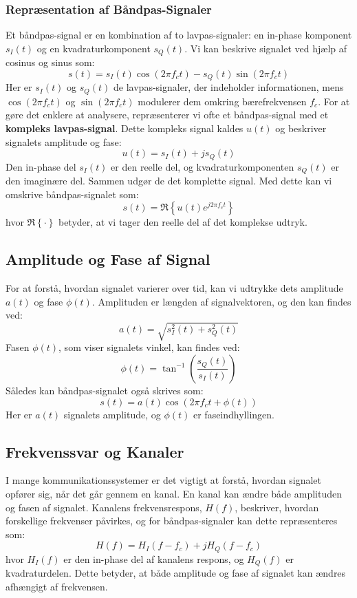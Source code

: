 \documentclass[a4paper,12pt]{book}
\begin{document}
	\subsubsection{Repræsentation af Båndpas-Signaler}
	Et båndpas-signal er en kombination af to lavpas-signaler: en in-phase komponent \( s_I(t) \) og en kvadraturkomponent \( s_Q(t) \). Vi kan beskrive signalet ved hjælp af cosinus og sinus som:
	\[
	s(t) = s_I(t) \cos(2\pi f_c t) - s_Q(t) \sin(2\pi f_c t)
	\]
	Her er \( s_I(t) \) og \( s_Q(t) \) de lavpas-signaler, der indeholder informationen, mens \( \cos(2\pi f_c t) \) og \( \sin(2\pi f_c t) \) modulerer dem omkring bærefrekvensen \( f_c \).
	\newline\newline\noindent
	For at gøre det enklere at analysere, repræsenterer vi ofte et båndpas-signal med et \textbf{kompleks lavpas-signal}. Dette kompleks signal kaldes \( u(t) \) og beskriver signalets amplitude og fase:
	\[
	u(t) = s_I(t) + j s_Q(t)
	\]
	Den in-phase del \( s_I(t) \) er den reelle del, og kvadraturkomponenten \( s_Q(t) \) er den imaginære del. Sammen udgør de det komplette signal. Med dette kan vi omskrive båndpas-signalet som:
	\[
	s(t) = \Re \left\{ u(t) e^{j 2 \pi f_c t} \right\}
	\]
	hvor \( \Re \left\{ \cdot \right\} \) betyder, at vi tager den reelle del af det komplekse udtryk.
	
	\subsection{Amplitude og Fase af Signal}
	For at forstå, hvordan signalet varierer over tid, kan vi udtrykke dets amplitude \( a(t) \) og fase \( \phi(t) \). Amplituden er længden af signalvektoren, og den kan findes ved:
	\[
	a(t) = \sqrt{s_I^2(t) + s_Q^2(t)}
	\]
	Fasen \( \phi(t) \), som viser signalets vinkel, kan findes ved:
	\[
	\phi(t) = \tan^{-1} \left( \frac{s_Q(t)}{s_I(t)} \right)
	\]
	Således kan båndpas-signalet også skrives som:
	\[
	s(t) = a(t) \cos(2 \pi f_c t + \phi(t))
	\]
	Her er \( a(t) \) signalets amplitude, og \( \phi(t) \) er faseindhyllingen.
	
	\subsection{Frekvenssvar og Kanaler}
	I mange kommunikationssystemer er det vigtigt at forstå, hvordan signalet opfører sig, når det går gennem en kanal. En kanal kan ændre både amplituden og fasen af signalet. Kanalens frekvensrespons, \( H(f) \), beskriver, hvordan forskellige frekvenser påvirkes, og for båndpas-signaler kan dette repræsenteres som:
	\[
	H(f) = H_I(f - f_c) + j H_Q(f - f_c)
	\]
	hvor \( H_I(f) \) er den in-phase del af kanalens respons, og \( H_Q(f) \) er kvadraturdelen. Dette betyder, at både amplitude og fase af signalet kan ændres afhængigt af frekvensen.
	
\end{document}
